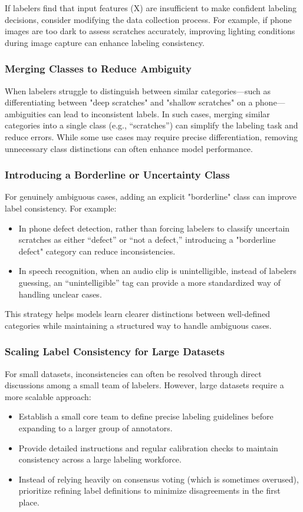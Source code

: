 \documentclass[12pt,openany]{book}
\begin{document}
If labelers find that input features (X) are insufficient to make confident labeling decisions, consider modifying the data collection process. For example, if phone images are too dark to assess scratches accurately, improving lighting conditions during image capture can enhance labeling consistency.

\subsubsection{Merging Classes to Reduce Ambiguity}
When labelers struggle to distinguish between similar categories—such as differentiating between "deep scratches" and "shallow scratches" on a phone—ambiguities can lead to inconsistent labels. In such cases, merging similar categories into a single class (e.g., “scratches”) can simplify the labeling task and reduce errors. While some use cases may require precise differentiation, removing unnecessary class distinctions can often enhance model performance.

\subsubsection{Introducing a Borderline or Uncertainty Class}
For genuinely ambiguous cases, adding an explicit "borderline" class can improve label consistency. For example:
\begin{itemize}
    \item In phone defect detection, rather than forcing labelers to classify uncertain scratches as either “defect” or “not a defect,” introducing a "borderline defect" category can reduce inconsistencies.
    \item In speech recognition, when an audio clip is unintelligible, instead of labelers guessing, an “unintelligible” tag can provide a more standardized way of handling unclear cases.
\end{itemize}

This strategy helps models learn clearer distinctions between well-defined categories while maintaining a structured way to handle ambiguous cases.

\subsubsection{Scaling Label Consistency for Large Datasets}
For small datasets, inconsistencies can often be resolved through direct discussions among a small team of labelers. However, large datasets require a more scalable approach:
\begin{itemize}
    \item Establish a small core team to define precise labeling guidelines before expanding to a larger group of annotators.
    \item Provide detailed instructions and regular calibration checks to maintain consistency across a large labeling workforce.
    \item Instead of relying heavily on consensus voting (which is sometimes overused), prioritize refining label definitions to minimize disagreements in the first place.
\end{itemize}
\end{document}
